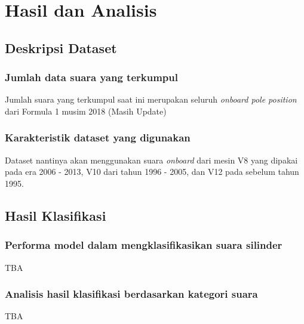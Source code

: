 \section{Hasil dan Analisis}

\subsection{Deskripsi Dataset}

\subsubsection{Jumlah data suara yang terkumpul}

Jumlah suara yang terkumpul saat ini merupakan seluruh \textit{onboard pole position} dari Formula 1 musim 2018 (Masih Update)

\subsubsection{Karakteristik dataset yang digunakan}

Dataset nantinya akan menggunakan suara \textit{onboard} dari mesin V8 yang dipakai pada era 2006 - 2013, V10 dari tahun 1996 - 2005, dan V12 pada sebelum tahun 1995.

\subsection{Hasil Klasifikasi}

\subsubsection{Performa model dalam mengklasifikasikan suara silinder}

TBA

\subsubsection{Analisis hasil klasifikasi berdasarkan kategori suara}

TBA

\newpage